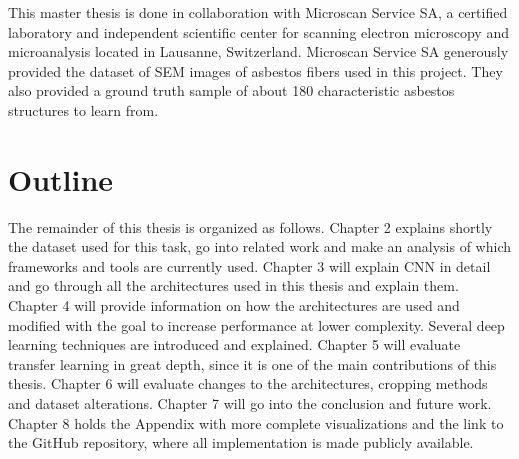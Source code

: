 This master thesis is done in collaboration with Microscan Service SA, a certified laboratory and independent scientific center for scanning electron microscopy and microanalysis located in Lausanne, Switzerland. Microscan Service SA generously provided the dataset of SEM images of asbestos fibers used in this project. They also provided a ground truth sample of about 180 characteristic asbestos structures to learn from.

\section{Outline}

The remainder of this thesis is organized as follows. Chapter 2 explains shortly the dataset used for this task, go into related work and make an analysis of which frameworks and tools are currently used. Chapter 3 will explain CNN in detail and go through all the architectures used in this thesis and explain them. Chapter 4 will provide information on how the architectures are used and modified with the goal to increase performance at lower complexity. Several deep learning techniques are introduced and explained. Chapter 5 will evaluate transfer learning in great depth, since it is one of the main contributions of this thesis. Chapter 6 will evaluate changes to the architectures, cropping methods and dataset alterations. Chapter 7 will go into the conclusion and future work. Chapter 8 holds the Appendix with more complete visualizations and the link to the GitHub repository, where all implementation is made publicly available.\\

